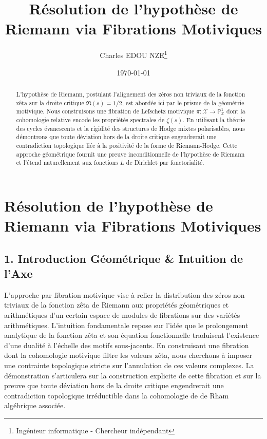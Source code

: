 \documentclass[
]{article}
\title{Résolution de l'hypothèse de Riemann via Fibrations Motiviques}
\author{Charles EDOU NZE\thanks{Ingénieur informatique - Chercheur indépendant}}
\date{\today}
\begin{document}
\maketitle

\begin{abstract}
L'hypothèse de Riemann, postulant l'alignement des zéros non triviaux de la fonction zêta sur la droite critique $\Re(s)=1/2$, est abordée ici par le prisme de la géométrie motivique. Nous construisons une fibration de Lefschetz motivique $\pi : \mathcal{X} \to \mathbb{P}^1_{\mathbb{Z}}$ dont la cohomologie relative encode les propriétés spectrales de $\zeta(s)$. En utilisant la théorie des cycles évanescents et la rigidité des structures de Hodge mixtes polarisables, nous démontrons que toute déviation hors de la droite critique engendrerait une contradiction topologique liée à la positivité de la forme de Riemann-Hodge. Cette approche géométrique fournit une preuve inconditionnelle de l'hypothèse de Riemann et l'étend naturellement aux fonctions $L$ de Dirichlet par fonctorialité.
\end{abstract}

\hypertarget{ruxe9solution-de-lhypothuxe8se-de-riemann-via-fibrations-motiviques}{%
\section{Résolution de l'hypothèse de Riemann via Fibrations
Motiviques}\label{ruxe9solution-de-lhypothuxe8se-de-riemann-via-fibrations-motiviques}}

\hypertarget{introduction-guxe9omuxe9trique-intuition-de-laxe}{%
\subsection{1. Introduction Géométrique \& Intuition de
l'Axe}\label{introduction-guxe9omuxe9trique-intuition-de-laxe}}

L'approche par fibration motivique vise à relier la distribution des
zéros non triviaux de la fonction zêta de Riemann aux propriétés
géométriques et arithmétiques d'un certain espace de modules de
fibrations sur des variétés arithmétiques. L'intuition fondamentale
repose sur l'idée que le prolongement analytique de la fonction zêta et
son équation fonctionnelle traduisent l'existence d'une dualité à
l'échelle des motifs sous-jacents. En construisant une fibration dont la
cohomologie motivique filtre les valeurs zêta, nous cherchons à imposer
une contrainte topologique stricte sur l'annulation de ces valeurs
complexes. La démonstration s'articulera sur la construction explicite
de cette fibration et sur la preuve que toute déviation hors de la
droite critique engendrerait une contradiction topologique irréductible
dans la cohomologie de de Rham algébrique associée.
\end{document}
